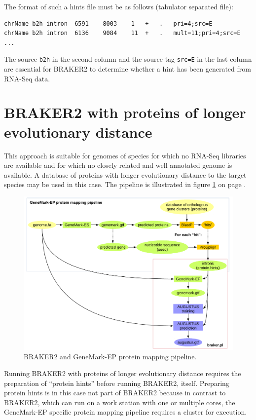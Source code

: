 \documentclass[a4paper,10pt]{report}
\begin{document}
The format of such a hints file must be as follows (tabulator separated file):

\begin{verbatim}
chrName	b2h	intron	6591	8003	1	+	.	pri=4;src=E
chrName	b2h	intron	6136	9084	11	+	.	mult=11;pri=4;src=E
...
\end{verbatim}

The source \texttt{b2h} in the second column and the source tag \texttt{src=E} in the last column are essential for BRAKER2 to determine whether a hint has been generated from RNA-Seq data. 

\section{BRAKER2 with proteins of longer evolutionary distance}

This approach is suitable for genomes of species for which no RNA-Seq libraries are available and for which no closely related and well annotated genome is available. A database of proteins with longer evolutionary distance to the target species may be used in this case. The pipeline is illustrated in figure \ref{gatech} on page \pageref{gatech}.

\begin{figure}
 \centering
 \includegraphics[scale=0.4]{./figs/gatech-prot-pipeline.pdf}
 \caption{BRAKER2 and GeneMark-EP protein mapping pipeline.}
 \label{gatech}
\end{figure}

Running BRAKER2 with proteins of longer evolutionary distance requires the preparation of ``protein hints'' before running BRAKER2, itself. Preparing protein hints is in this case not part of BRAKER2 because in contrast to BRAKER2, which can run on a work station with one or multiple cores, the GeneMark-EP specific protein mapping pipeline requires a cluster for execution.
\end{document}
